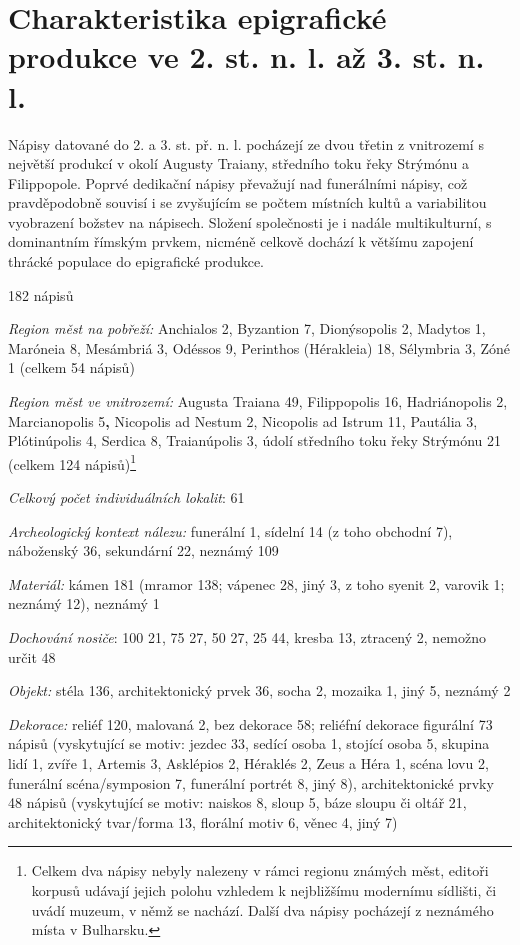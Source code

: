 \section[charakteristika-epigrafické-produkce-ve-2.-st.-n.-l.-až-3.-st.-n.-l.]{Charakteristika epigrafické produkce ve 2. st. n. l. až 3. st. n. l.}

Nápisy datované do 2. a 3. st. př. n. l. pocházejí ze dvou třetin z vnitrozemí s největší produkcí v okolí Augusty Traiany, středního toku řeky Strýmónu a Filippopole. Poprvé dedikační nápisy převažují nad funerálními nápisy, což pravděpodobně souvisí i se zvyšujícím se počtem místních kultů a variabilitou vyobrazení božstev na nápisech. Složení společnosti je i nadále multikulturní, s dominantním římským prvkem, nicméně celkově dochází k většímu zapojení thrácké populace do epigrafické produkce.

\placetable[none]{}
\starttable[|l|]
\HL
{} 182 nápisů

{\em Region měst na pobřeží:} Anchialos 2, Byzantion 7, Dionýsopolis 2, Madytos 1, Maróneia 8, Mesámbriá 3, Odéssos 9, Perinthos (Hérakleia) 18, Sélymbria 3, Zóné 1 (celkem 54 nápisů)

{\em Region měst ve vnitrozemí:} Augusta Traiana 49, Filippopolis 16, Hadriánopolis 2, Marcianopolis 5{\bf ,} Nicopolis ad Nestum 2, Nicopolis ad Istrum 11, Pautália 3, Plótinúpolis 4, Serdica 8, Traianúpolis 3, údolí středního toku řeky Strýmónu 21 (celkem 124 nápisů)\footnote{Celkem dva nápisy nebyly nalezeny v rámci regionu známých měst, editoři korpusů udávají jejich polohu vzhledem k nejbližšímu modernímu sídlišti, či uvádí muzeum, v němž se nachází. Další dva nápisy pocházejí z neznámého místa v Bulharsku.}

{\em Celkový počet individuálních lokalit}: 61

{\em Archeologický kontext nálezu:} funerální 1, sídelní 14 (z toho obchodní 7), náboženský 36, sekundární 22, neznámý 109

{\em Materiál:} kámen 181 (mramor 138; vápenec 28, jiný 3, z toho syenit 2, varovik 1; neznámý 12), neznámý 1

{\em Dochování nosiče}: 100  21, 75  27, 50  27, 25  44, kresba 13, ztracený 2, nemožno určit 48

{\em Objekt:} stéla 136, architektonický prvek 36, socha 2, mozaika 1, jiný 5, neznámý 2

{\em Dekorace:} reliéf 120, malovaná 2, bez dekorace 58; reliéfní dekorace figurální 73 nápisů (vyskytující se motiv: jezdec 33, sedící osoba 1, stojící osoba 5, skupina lidí 1, zvíře 1, Artemis 3, Asklépios 2, Héraklés 2, Zeus a Héra 1, scéna lovu 2, funerální scéna/symposion 7, funerální portrét 8, jiný 8), architektonické prvky 48 nápisů (vyskytující se motiv: naiskos 8, sloup 5, báze sloupu či oltář 21, architektonický tvar/forma 13, florální motiv 6, věnec 4, jiný 7)

